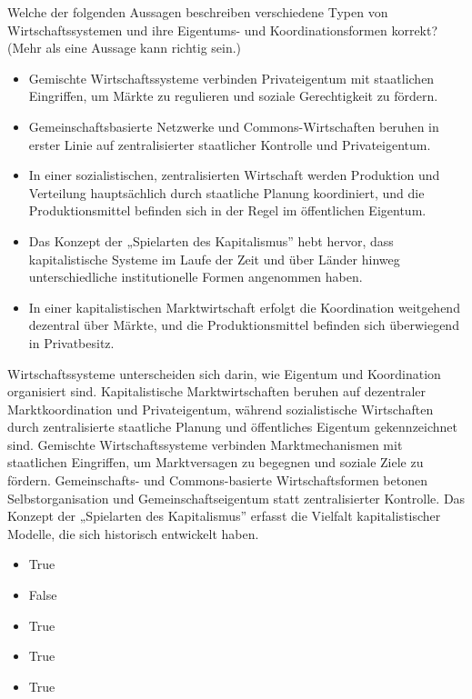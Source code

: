 \documentclass[
  nswissgerman,
  a4paper,
  openany]{book}
\providecommand{\tightlist}{%
  \setlength{\itemsep}{0pt}\setlength{\parskip}{0pt}}
\begin{document}
Welche der folgenden Aussagen beschreiben verschiedene Typen von
Wirtschaftssystemen und ihre Eigentums- und Koordinationsformen korrekt?
(Mehr als eine Aussage kann richtig sein.)

\begin{itemize}
\tightlist
\item[$\square$]
  Gemischte Wirtschaftssysteme verbinden Privateigentum mit staatlichen
  Eingriffen, um Märkte zu regulieren und soziale Gerechtigkeit zu
  fördern.
\item[$\square$]
  Gemeinschaftsbasierte Netzwerke und Commons-Wirtschaften beruhen in
  erster Linie auf zentralisierter staatlicher Kontrolle und
  Privateigentum.
\item[$\square$]
  In einer sozialistischen, zentralisierten Wirtschaft werden Produktion
  und Verteilung hauptsächlich durch staatliche Planung koordiniert, und
  die Produktionsmittel befinden sich in der Regel im öffentlichen
  Eigentum.
\item[$\square$]
  Das Konzept der „Spielarten des Kapitalismus'' hebt hervor, dass
  kapitalistische Systeme im Laufe der Zeit und über Länder hinweg
  unterschiedliche institutionelle Formen angenommen haben.
\item[$\square$]
  In einer kapitalistischen Marktwirtschaft erfolgt die Koordination
  weitgehend dezentral über Märkte, und die Produktionsmittel befinden
  sich überwiegend in Privatbesitz.
\end{itemize}

Wirtschaftssysteme unterscheiden sich darin, wie Eigentum und
Koordination organisiert sind. Kapitalistische Marktwirtschaften beruhen
auf dezentraler Marktkoordination und Privateigentum, während
sozialistische Wirtschaften durch zentralisierte staatliche Planung und
öffentliches Eigentum gekennzeichnet sind. Gemischte Wirtschaftssysteme
verbinden Marktmechanismen mit staatlichen Eingriffen, um Marktversagen
zu begegnen und soziale Ziele zu fördern. Gemeinschafts- und
Commons-basierte Wirtschaftsformen betonen Selbstorganisation und
Gemeinschaftseigentum statt zentralisierter Kontrolle. Das Konzept der
„Spielarten des Kapitalismus'' erfasst die Vielfalt kapitalistischer
Modelle, die sich historisch entwickelt haben.

\begin{itemize}
\tightlist
\item
  True
\item
  False
\item
  True
\item
  True
\item
  True
\end{itemize}
\end{document}
